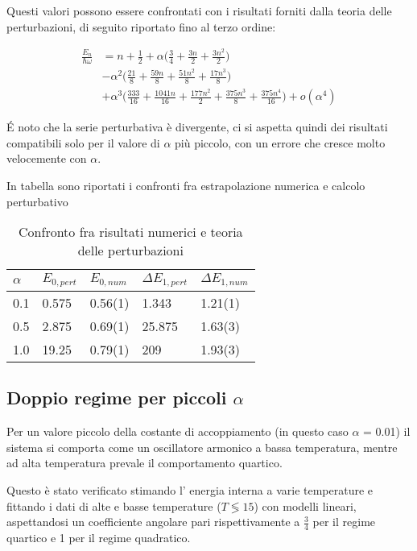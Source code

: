 \documentclass{article}
\begin{document}
Questi valori possono essere confrontati con i risultati forniti dalla teoria delle perturbazioni, di seguito riportato fino al terzo ordine:

\begin{equation}
\begin{split}
\frac{E_n}{\hbar\omega}  &= n + \frac{1}{2} + \alpha\Big(\frac{3}{4}+\frac{3n}{2}+\frac{3n^2}{2}\Big)\\
&   -\alpha^2\Big(\frac{21}{8}+\frac{59n}{8}+\frac{51n^2}{8}+\frac{17n^3}{8}\Big)\\
&   +\alpha^3\Big(\frac{333}{16}+\frac{1041n}{16}+\frac{177n^2}{2}+\frac{375n^3}{8}+\frac{375n^4}{16}\Big) + o(\alpha^4)
\end{split}
\end{equation}

\'E noto che la serie perturbativa è divergente, ci si aspetta quindi dei risultati compatibili solo per il valore di $\alpha$ più piccolo, con un errore che cresce molto velocemente con $\alpha$.

In tabella sono riportati i confronti fra estrapolazione numerica e calcolo perturbativo

\begin{table}[h]
\centering
\begin{tabular}{lllll}
$\alpha$ & $E_{0,pert}$ & $E_{0,num}$ & $\Delta E_{1,pert}$ & $\Delta E_{1,num}$ \\ \hline\hline
0.1      & 0.575        &    0.56(1)         & 1.343               &         1.21(1)           \\ 
0.5      & 2.875        &   0.69(1)          & 25.875              &    1.63(3)                \\ 
1.0      & 19.25        &   0.79(1)          & 209                 &          1.93(3)         
\end{tabular}
\caption{Confronto fra risultati numerici e teoria delle perturbazioni}
\label{pertvsnum}
\end{table}
\newpage
\subsection{Doppio regime per piccoli $\alpha$}
Per un valore piccolo della costante di accoppiamento (in questo caso $\alpha$ = 0.01) il sistema si comporta come un oscillatore armonico a bassa temperatura, mentre ad alta temperatura prevale il comportamento quartico.

Questo è stato verificato stimando l' energia interna a varie temperature e fittando i dati di alte e basse temperature ($T\lessgtr 15$) con modelli lineari, aspettandosi un coefficiente angolare pari rispettivamente a $\frac{3}{4}$ per il regime quartico e 1 per il regime quadratico.
\end{document}
